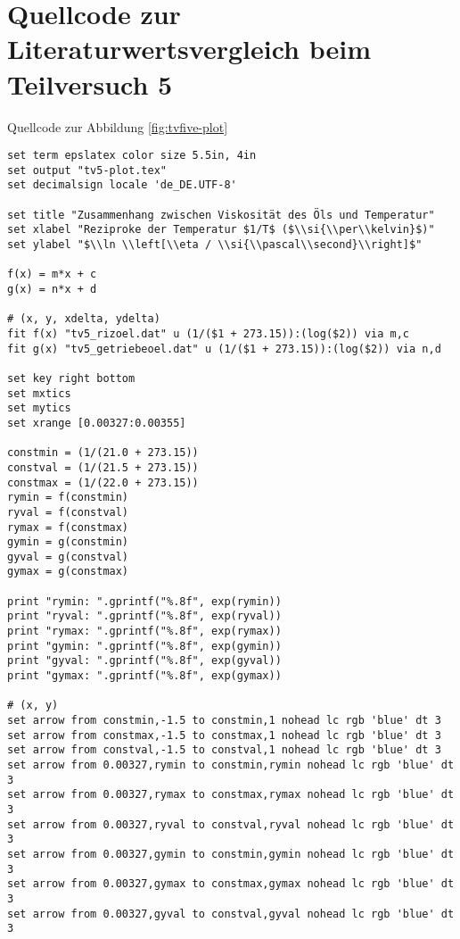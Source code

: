 \section{\gnuplot{} Quellcode zur Literaturwertsvergleich beim Teilversuch 5}
    \label{appdx:tv5gnuplot}
	\gnuplot{} Quellcode zur Abbildung \ref{fig:tvfive-plot}
	{  
        \renewcommand{\fcolorbox}[4][]{#4}
        \begin{verbatim}
set term epslatex color size 5.5in, 4in
set output "tv5-plot.tex"
set decimalsign locale 'de_DE.UTF-8'

set title "Zusammenhang zwischen Viskosität des Öls und Temperatur"
set xlabel "Reziproke der Temperatur $1/T$ ($\\si{\\per\\kelvin}$)"
set ylabel "$\\ln \\left[\\eta / \\si{\\pascal\\second}\\right]$"

f(x) = m*x + c
g(x) = n*x + d

# (x, y, xdelta, ydelta)
fit f(x) "tv5_rizoel.dat" u (1/($1 + 273.15)):(log($2)) via m,c
fit g(x) "tv5_getriebeoel.dat" u (1/($1 + 273.15)):(log($2)) via n,d

set key right bottom
set mxtics
set mytics
set xrange [0.00327:0.00355]

constmin = (1/(21.0 + 273.15))
constval = (1/(21.5 + 273.15))
constmax = (1/(22.0 + 273.15))
rymin = f(constmin)
ryval = f(constval)
rymax = f(constmax)
gymin = g(constmin)
gyval = g(constval)
gymax = g(constmax)

print "rymin: ".gprintf("%.8f", exp(rymin))
print "ryval: ".gprintf("%.8f", exp(ryval))
print "rymax: ".gprintf("%.8f", exp(rymax))
print "gymin: ".gprintf("%.8f", exp(gymin))
print "gyval: ".gprintf("%.8f", exp(gyval))
print "gymax: ".gprintf("%.8f", exp(gymax))

# (x, y)
set arrow from constmin,-1.5 to constmin,1 nohead lc rgb 'blue' dt 3
set arrow from constmax,-1.5 to constmax,1 nohead lc rgb 'blue' dt 3
set arrow from constval,-1.5 to constval,1 nohead lc rgb 'blue' dt 3
set arrow from 0.00327,rymin to constmin,rymin nohead lc rgb 'blue' dt 3
set arrow from 0.00327,rymax to constmax,rymax nohead lc rgb 'blue' dt 3
set arrow from 0.00327,ryval to constval,ryval nohead lc rgb 'blue' dt 3
set arrow from 0.00327,gymin to constmin,gymin nohead lc rgb 'blue' dt 3
set arrow from 0.00327,gymax to constmax,gymax nohead lc rgb 'blue' dt 3
set arrow from 0.00327,gyval to constval,gyval nohead lc rgb 'blue' dt 3


\end{verbatim}}
